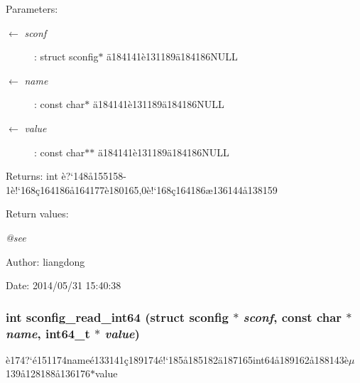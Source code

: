 \begin{Desc}
\item[Parameters:]
\begin{description}
\item[\mbox{$\leftarrow$} {\em sconf}]: struct sconfig$\ast$ \"{a}184141\`{e}131189\"{a}184186NULL \item[\mbox{$\leftarrow$} {\em name}]: const char$\ast$ \"{a}184141\`{e}131189\"{a}184186NULL \item[\mbox{$\leftarrow$} {\em value}]: const char$\ast$$\ast$ \"{a}184141\`{e}131189\"{a}184186NULL \end{description}
\end{Desc}
\begin{Desc}
\item[Returns:]int \`{e}?`148\aa{}155158-1\`{e}!`168\c{c}164186\aa{}164177\`{e}180165,0\`{e}!`168\c{c}164186\ae{}136144\aa{}138159 \end{Desc}
\begin{Desc}
\item[Return values:]
\begin{description}
\item[{\em @see}]\end{description}
\end{Desc}
\begin{Desc}
\item[Author:]liangdong \end{Desc}
\begin{Desc}
\item[Date:]2014/05/31 15:40:38 \end{Desc}
\subsubsection{\setlength{\rightskip}{0pt plus 5cm}int sconfig\_\-read\_\-int64 (struct sconfig $\ast$ {\em sconf}, const char $\ast$ {\em name}, int64\_\-t $\ast$ {\em value})}\label{sconfig_8c_a9}


\`{e}174?`\'{e}151174name\'{e}133141\c{c}189174\'{e}!`185\aa{}185182\"{a}187165int64\aa{}189162\aa{}188143\`{e}$\mu$139\aa{}128188\aa{}136176$\ast$value 

